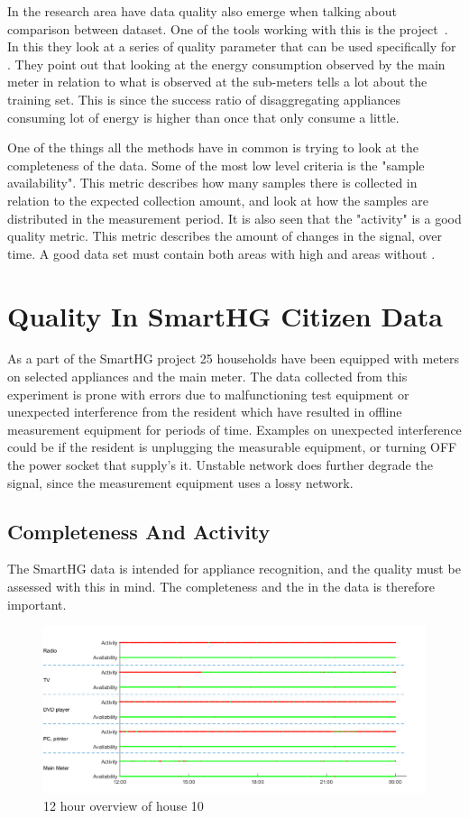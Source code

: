 In the  research area have data quality also emerge when talking about comparison between dataset. One of the tools working with this is the  project~\citep{RefWorks:21}. In this they look at a series of quality parameter that can be used specifically for . They point out that looking at the energy consumption observed by the main meter in relation to what is observed at the sub-meters tells a lot about the training set. This is since the success ratio of disaggregating appliances consuming lot of energy is higher than once that only consume a little. 

One of the things all the methods have in common is trying to look at the completeness of the data. Some of the most low level criteria is the "sample availability". This metric describes how many samples there is collected in relation to the expected collection amount, and look at how the samples are distributed in the measurement period. It is also seen that the "activity" is a good quality metric. This metric describes the amount of changes in the signal, over time. A good data set must contain both areas with high  and areas without . 

\section{Quality In SmartHG Citizen Data}
As a part of the SmartHG project 25 households have been equipped with meters on selected appliances and the main meter. The data collected from this experiment is prone with errors due to malfunctioning test equipment or unexpected interference from the resident which have resulted in offline measurement equipment for periods of time. Examples on unexpected interference could be if the resident is unplugging the measurable equipment, or turning OFF the power socket that supply's it. Unstable network does further degrade the signal, since the measurement equipment uses a lossy network. 

\subsection{Completeness And Activity}
The SmartHG data is intended for appliance recognition, and the quality must be assessed with this in mind. The completeness and the  in the data is therefore important. 

\begin{figure}[H]
\centering
\includegraphics[width=1\textwidth]{billeder/Test.png}
\caption{12 hour overview of house 10}
\label{fig:12HRes}
\end{figure}

